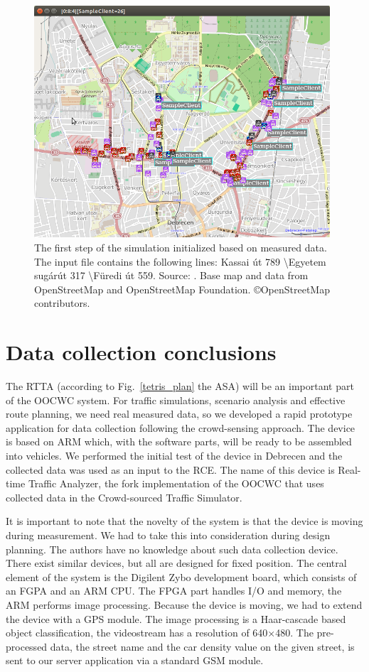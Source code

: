 \documentclass[b5paper,12pt]{report}
\theoremstyle{definition}
\begin{document}
\begin{figure}[ht!]
\centerline{
\includegraphics[width=11cm]{img/ut3.png}}
\caption{The first step of the simulation initialized based on measured data. The input file contains the following lines: Kassai \'ut 789 \textbackslash  Egyetem sug\'ar\'ut 317  \textbackslash  F\"uredi \'ut 559. Source: \cite{infocomjournal}. Base map and data from OpenStreetMap and OpenStreetMap Foundation. \copyright OpenStreetMap contributors.}
\label{simulinit}
\end{figure}

\section{Data collection conclusions}

The RTTA (according to Fig.~\ref{tetris_plan} the ASA) will be an important part of the OOCWC system. For traffic simulations, scenario analysis and effective route planning, we need real measured data, so we developed a rapid prototype application for data collection following the crowd-sensing approach. The device is based on ARM which, with the software parts, will be ready to be assembled into vehicles. We performed the initial test of the device in Debrecen and the collected data was used as an input to the RCE. The name of this device is Real-time Traffic Analyzer, the fork implementation of the OOCWC that uses collected data in the Crowd-sourced Traffic Simulator.

It is important to note that the novelty of the system is that the device is moving during measurement. We had to take this into consideration during design planning. The authors have no knowledge about such data collection device. There exist similar devices, but all are designed for fixed position. The central element of the system is the Digilent Zybo development board, which consists of an FGPA and an ARM CPU. The FPGA part handles I/O and memory, the ARM performs image processing. Because the device is moving, we had to extend the device with a GPS module. The image processing is a Haar-cascade based object classification, the videostream has a resolution of 640$\times$480. The pre-processed data, the street name and the car density value on the given street, is sent to our server application via a standard GSM module.
\end{document}
